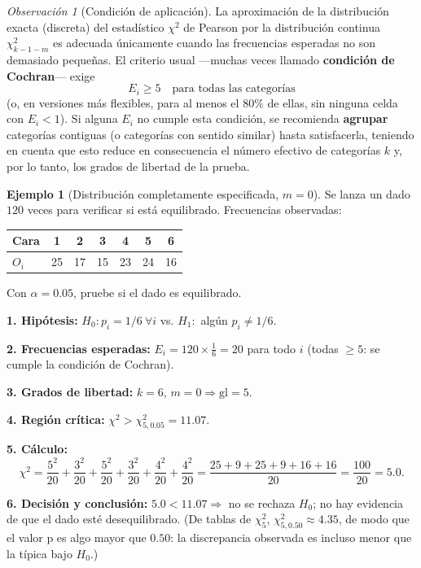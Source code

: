 \documentclass[11pt,a4paper]{article}
\theoremstyle{plain}
\theoremstyle{definition}
\newtheorem{ejemplo}[teorema]{Ejemplo}
\theoremstyle{remark}
\newtheorem{observacion}[teorema]{Observación}
\begin{document}
\begin{observacion}[Condición de aplicación]
La aproximación de la distribución exacta (discreta) del estadístico $\chi^2$ de Pearson por la distribución continua $\chi^2_{k-1-m}$ es adecuada únicamente cuando las frecuencias esperadas no son demasiado pequeñas. El criterio usual —muchas veces llamado \textbf{condición de Cochran}— exige
\[
E_i\ge5 \quad \text{para todas las categorías}
\]
(o, en versiones más flexibles, para al menos el $80\%$ de ellas, sin ninguna celda con $E_i<1$).
Si alguna $E_i$ no cumple esta condición, se recomienda \textbf{agrupar} categorías contiguas (o categorías con sentido similar) hasta satisfacerla, teniendo en cuenta que esto reduce en consecuencia el número efectivo de categorías $k$ y, por lo tanto, los grados de libertad de la prueba.
\end{observacion}

\begin{ejemplo}[Distribución completamente especificada, $m=0$]
Se lanza un dado $120$ veces para verificar si está equilibrado. Frecuencias observadas:
\begin{center}
\begin{tabular}{@{}lcccccc@{}}
\toprule
Cara & 1 & 2 & 3 & 4 & 5 & 6 \\
\midrule
$O_i$ & 25 & 17 & 15 & 23 & 24 & 16 \\
\bottomrule
\end{tabular}
\end{center}
Con $\alpha=0.05$, pruebe si el dado es equilibrado.

\textbf{1. Hipótesis:} $H_0:p_i=1/6\ \forall i$ vs. $H_1:$ algún $p_i\neq1/6$.

\textbf{2. Frecuencias esperadas:} $E_i=120\times\tfrac16=20$ para todo $i$ (todas $\ge5$: se cumple la condición de Cochran).

\textbf{3. Grados de libertad:} $k=6$, $m=0\Rightarrow \text{gl}=5$.

\textbf{4. Región crítica:} $\chi^2>\chi^2_{5,0.05}=11.07$.

\textbf{5. Cálculo:}
\[
\chi^2=\frac{5^2}{20}+\frac{3^2}{20}+\frac{5^2}{20}+\frac{3^2}{20}+\frac{4^2}{20}+\frac{4^2}{20}=\frac{25+9+25+9+16+16}{20}=\frac{100}{20}=5.0.
\]

\textbf{6. Decisión y conclusión:} $5.0<11.07\Rightarrow$ no se rechaza $H_0$; no hay evidencia de que el dado esté desequilibrado. (De tablas de $\chi^2_5$, $\chi^2_{5,0.50}\approx4.35$, de modo que el valor p es algo mayor que $0.50$: la discrepancia observada es incluso menor que la típica bajo $H_0$.)
\end{ejemplo}
\end{document}
